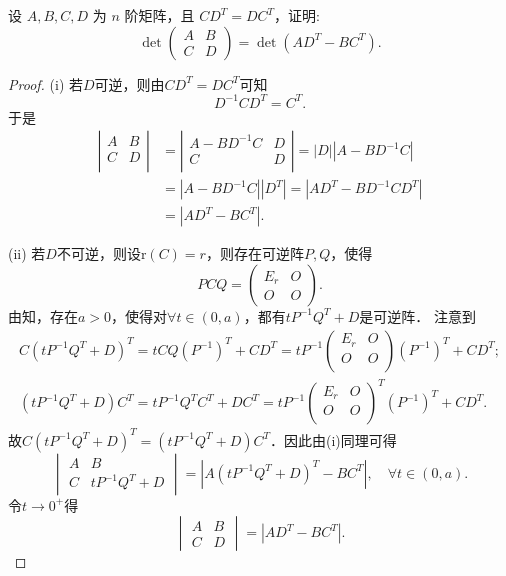 \documentclass[../../main.tex]{subfiles}%
\begin{document}
\begin{example}
设 \( A,B,C,D \) 为 \( n \) 阶矩阵，且 \( CD^T = DC^T \)，证明:
$$\det \begin{pmatrix} A & B \\ C & D \end{pmatrix} = \det(AD^T - BC^T).$$
\end{example}
\begin{proof}

(i) 若$D$可逆，则由$CD^T=DC^T$可知
$$D^{-1}CD^T=C^T.$$
于是
\begin{align*}
\left| \begin{matrix}
A&		B\\
C&		D\\
\end{matrix} \right|&=\left| \begin{matrix}
	A-BD^{-1}C&		D\\
	C&		D\\
\end{matrix} \right|=\left| D \right|\left| A-BD^{-1}C \right|
\\
&=\left| A-BD^{-1}C \right|\left| D^T \right|=\left| AD^T-BD^{-1}CD^T \right|
\\
&=\left| AD^T-BC^T \right|.
\end{align*}

(ii) 若$D$不可逆，则设$\text{r}(C)=r$，则存在可逆阵$P,Q$，使得
$$PCQ=\begin{pmatrix} E_r & O \\ O & O \end{pmatrix}.$$
由知，存在$a>0$，使得对$\forall t\in (0,a)$，都有$tP^{-1}Q^T+D$是可逆阵．
注意到
\begin{gather*}
C\left( tP^{-1}Q^T+D \right) ^T=tCQ\left( P^{-1} \right) ^T+CD^T=tP^{-1}\left( \begin{matrix}
E_r&		O\\
O&		O\\
\end{matrix} \right) \left( P^{-1} \right) ^T+CD^T;
\\
\left( tP^{-1}Q^T+D \right) C^T=tP^{-1}Q^TC^T+DC^T=tP^{-1}\left( \begin{matrix}
E_r&		O\\
O&		O\\
\end{matrix} \right) ^T\left( P^{-1} \right) ^T+CD^T.
\end{gather*}
故$C\left( tP^{-1}Q^T+D \right)^T=\left( tP^{-1}Q^T+D \right) C^T$．因此由(i)同理可得
$$\begin{vmatrix} A & B \\ C & tP^{-1}Q^T+D \end{vmatrix}=\left| A\left( tP^{-1}Q^T+D \right)^T-BC^T \right|,\quad \forall t\in (0,a).$$
令$t\rightarrow 0^+$得
$$\begin{vmatrix} A & B \\ C & D \end{vmatrix}=\left| AD^T-BC^T \right|.$$

\end{proof}
\end{document}

